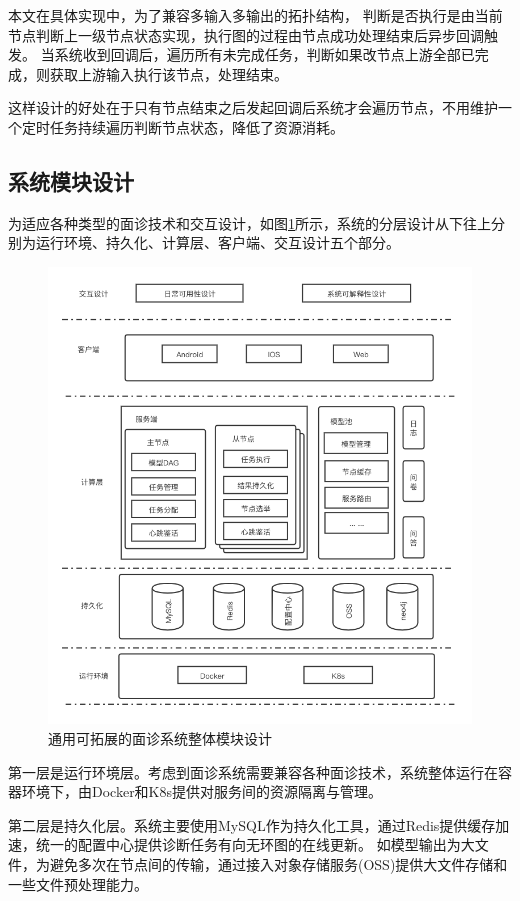 本文在具体实现中，为了兼容多输入多输出的拓扑结构，
判断是否执行是由当前节点判断上一级节点状态实现，执行图的过程由节点成功处理结束后异步回调触发。
当系统收到回调后，遍历所有未完成任务，判断如果改节点上游全部已完成，则获取上游输入执行该节点，处理结束。

这样设计的好处在于只有节点结束之后发起回调后系统才会遍历节点，不用维护一个定时任务持续遍历判断节点状态，降低了资源消耗。


\subsection{系统模块设计}
为适应各种类型的面诊技术和交互设计，如图\ref{fig:system}所示，系统的分层设计从下往上分别为运行环境、持久化、计算层、客户端、交互设计五个部分。

\begin{figure}
    \centering
    \includegraphics[width=15cm]{images/server8.png}
    \caption{通用可拓展的面诊系统整体模块设计}
    \label{fig:system}
\end{figure}


第一层是运行环境层。考虑到面诊系统需要兼容各种面诊技术，系统整体运行在容器环境下，由Docker和K8s提供对服务间的资源隔离与管理。

第二层是持久化层。系统主要使用MySQL作为持久化工具，通过Redis提供缓存加速，统一的配置中心提供诊断任务有向无环图的在线更新。
如模型输出为大文件，为避免多次在节点间的传输，通过接入对象存储服务(OSS)提供大文件存储和一些文件预处理能力。

